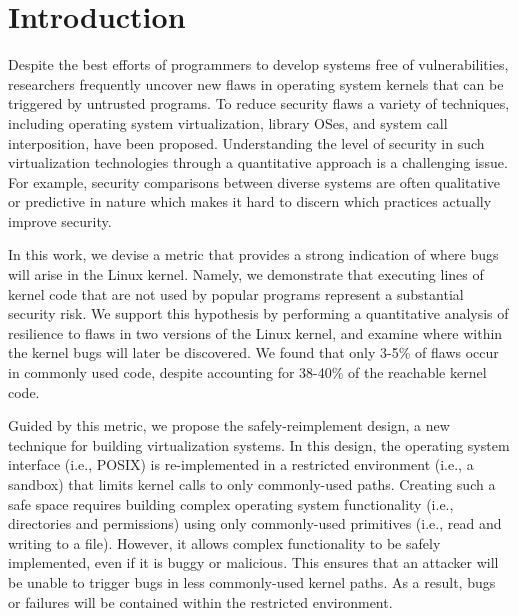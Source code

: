 \section{Introduction}
\label{sec.introduction}

Despite the best efforts of programmers to develop systems free of vulnerabilities,
researchers frequently uncover new flaws in operating system kernels that can be
triggered by untrusted programs. To reduce security flaws
a variety of techniques, including operating system virtualization, library OSes,
and system call interposition, have been proposed. Understanding the level of security in such virtualization technologies through a quantitative approach is a challenging issue. For example, security comparisons between diverse systems are often qualitative or predictive in nature which makes it hard to discern which practices actually improve security.


In this work, we devise a metric that provides a strong indication of where bugs
will arise in the Linux kernel. Namely, we demonstrate
that executing lines of kernel code that are not used by popular programs represent
a substantial security risk. We support this hypothesis by performing a quantitative
 analysis of resilience to flaws in two versions of the Linux kernel, and examine
where within the kernel bugs will later be discovered. We found that only 3-5\%
  of flaws occur in commonly used code, despite accounting for
 38-40\%  of the reachable kernel code.

Guided by this metric, we propose the safely-reimplement design, a new
technique for building virtualization systems. In this design, the operating
system interface (i.e., POSIX) is re-implemented in a restricted environment
(i.e., a sandbox) that limits kernel calls to only commonly-used paths.
Creating such a safe space requires building complex operating system functionality
(i.e., directories and permissions) using only commonly-used primitives (i.e.,
read and writing to a file). However, it allows complex functionality to be safely
implemented, even if it is buggy or malicious.
This ensures that an attacker will be unable to trigger bugs in less
commonly-used kernel paths. As a result, bugs or failures
will be contained within the restricted environment.

